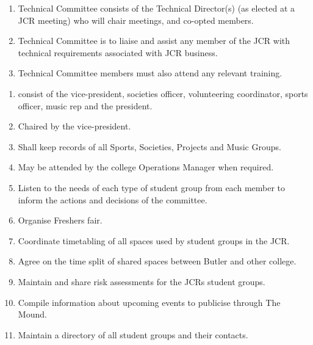 
\begin{enumerate}
    \item Technical Committee consists of the Technical Director(s) (as elected at a JCR meeting) who will chair meetings, and co-opted members.
    \item Technical Committee is to liaise and assist any member of the JCR with technical requirements associated with JCR business.
    \item Technical Committee members must also attend any relevant training.
\end{enumerate}


\begin{enumerate}
    \item consist of the vice-president, societies officer, volunteering coordinator, sports officer, music rep and the president. 
    \item Chaired by the vice-president.
    \item Shall keep records of all Sports, Societies, Projects and Music Groups.
    \item May be attended by the college Operations Manager when required. 
    \item Listen to the needs of each type of student group from each member to inform the actions and decisions of the committee. 
    \item Organise Freshers fair.
    \item Coordinate timetabling of all spaces used by student groups in the JCR.
    \item Agree on the time split of shared spaces between Butler and other college. 
    \item Maintain and share risk assessments for the JCRs student groups.
    \item Compile information about upcoming events to publicise through The Mound.  
    \item Maintain a directory of all student groups and their contacts.
    
\end{enumerate}

